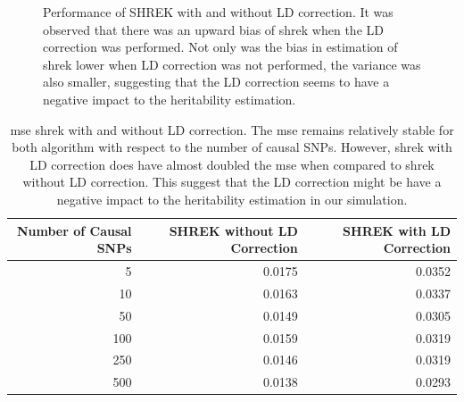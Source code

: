 \begin{figure}
{				
				\label{fig:shrekCVar}
			}
			\caption[Performance of SHREK with and without LD correction]
			{Performance of SHREK with and without LD correction.
				It was observed that there was an upward bias of \gls{shrek} when the \gls{LD} correction was performed. 
				Not only was the bias in estimation of \gls{shrek} lower when \gls{LD} correction was not performed, the variance was also smaller, suggesting that the \gls{LD} correction seems to have a negative impact to the heritability estimation.
				} 
			\label{fig:shrekLDCom}
		\end{figure}
		\begin{table}
			\centering
			\begin{tabular}{rrr}
				\toprule
				Number of Causal SNPs & SHREK without LD Correction & SHREK with LD Correction \\
				\midrule
				5	&	0.0175	&	0.0352 \\
				10	&	0.0163	&	0.0337 \\
				50	&	0.0149	&	0.0305 \\
				100	&	0.0159	&	0.0319 \\
				250	&	0.0146	&	0.0319 \\
				500	&	0.0138	&	0.0293 \\
				\bottomrule
			\end{tabular}
			\caption[Mean Squared Error of SHREK with and without LD Correction]{
				\gls{mse} \gls{shrek} with and without \gls{LD} correction.
				The \gls{mse} remains relatively stable for both algorithm with respect to the number of causal \glspl{SNP}.
				However, \gls{shrek} with \gls{LD} correction does have almost doubled the \gls{mse} when compared to \gls{shrek} without \gls{LD} correction. 
				This suggest that the \gls{LD} correction might be have a negative impact to the heritability estimation in our simulation.
				}
			\label{tab:shrekLDmse}
		\end{table}
		
